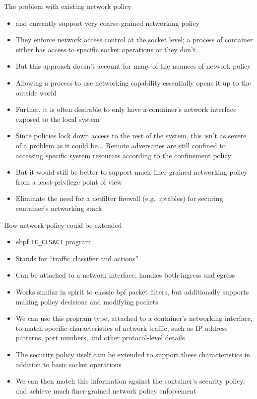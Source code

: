 \begin{inprogress}
  The problem with existing network policy
  \begin{itemize}
    \item \bpfbox{} and \bpfcontain{} currently support very coarse-grained networking policy
    \item They enforce network access control at the socket level; a process of container
    either has access to specific socket operations or they don't
    \item But this approach doesn't account for many of the nuances of network policy
    \item Allowing a process to use networking capability essentially opens it up to the outside world
    \item Further, it is often desirable to only have a container's network interface exposed to the local system
    \item Since policies lock down access to the rest of the system, this isn't as severe of a problem as it could be... Remote adversaries are still confined to accessing specific system resources according to the confinement policy
    \item But it would still be better to support much finer-grained networking policy from a least-privilege point of view
    \item Eliminate the need for a netfilter firewall (e.g.~iptables) for securing container's networking stack
  \end{itemize}

  How network policy could be extended
  \begin{itemize}
    \item \gls{ebpf} \texttt{TC\_CLSACT} program
    \item Stands for \enquote{traffic classifier and actions}
    \item Can be attached to a network interface, handles both ingress and egress
    \item Works similar in spirit to classic \gls{bpf} packet filters, but additionally supports making policy decisions and modifying packets
    \item We can use this program type, attached to a container's networking interface, to match specific characteristics of network traffic,
    such as IP address patterns, port numbers, and other protocol-level details
    \item The security policy itself cam be extended to support these characteristics in addition to basic socket operations
    \item We can then match this information against the container's security policy, and achieve much finer-grained network policy enforcement
  \end{itemize}
\end{inprogress}

